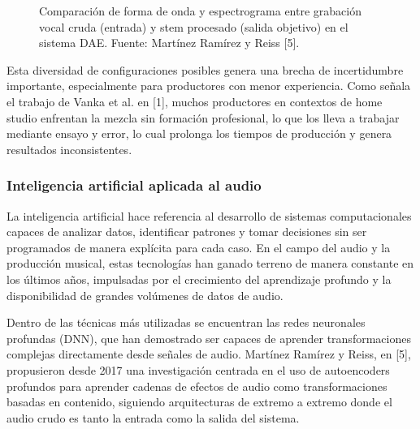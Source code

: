 \documentclass[12pt]{article}
\begin{document}
\begin{figure}[h!]
\centering
\caption{Comparación de forma de onda y espectrograma entre grabación vocal cruda (entrada) y stem procesado (salida objetivo) en el sistema DAE. Fuente: Martínez Ramírez y Reiss [5].}
\label{fig:fig1}
\end{figure}

Esta diversidad de configuraciones posibles genera una brecha de incertidumbre importante, especialmente para productores con menor experiencia. Como señala el trabajo de Vanka et al. en [1], muchos productores en contextos de home studio enfrentan la mezcla sin formación profesional, lo que los lleva a trabajar mediante ensayo y error, lo cual prolonga los tiempos de producción y genera resultados inconsistentes.

\subsubsection*{Inteligencia artificial aplicada al audio}

La inteligencia artificial hace referencia al desarrollo de sistemas computacionales capaces de analizar datos, identificar patrones y tomar decisiones sin ser programados de manera explícita para cada caso. En el campo del audio y la producción musical, estas tecnologías han ganado terreno de manera constante en los últimos años, impulsadas por el crecimiento del aprendizaje profundo y la disponibilidad de grandes volúmenes de datos de audio.

Dentro de las técnicas más utilizadas se encuentran las redes neuronales profundas (DNN), que han demostrado ser capaces de aprender transformaciones complejas directamente desde señales de audio. Martínez Ramírez y Reiss, en [5], propusieron desde 2017 una investigación centrada en el uso de autoencoders profundos para aprender cadenas de efectos de audio como transformaciones basadas en contenido, siguiendo arquitecturas de extremo a extremo donde el audio crudo es tanto la entrada como la salida del sistema.
\end{document}
